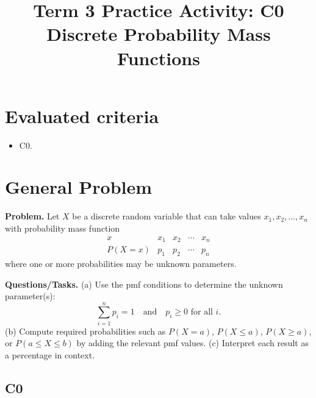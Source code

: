 \makeatletter
{}
\makeatother	



\title{Term 3 Practice Activity: C0 Discrete Probability Mass Functions}
\author{}
\date{}


	\maketitle

	\setcounter{tocdepth}{1}
	\setcounter{secnumdepth}{2}
	\tableofcontents

	\section*{Evaluated criteria}
	\begin{itemize}
		\item C0.
	\end{itemize}

	
	\newcommand{\PMFHighlight}[2]{%
		\addplot+[ycomb, mark=*, line width=0.8pt, blue] coordinates {#1};
		\addplot+[ycomb, mark=*, line width=1.3pt, black] coordinates {#2};
	}
	
	

\section{General Problem}
		
		\textbf{Problem.}
		Let $X$ be a discrete random variable that can take values $x_1,x_2,\dots,x_n$ with probability mass function
		\[
		\begin{array}{c|cccc}
			x & x_1 & x_2 & \cdots & x_n\\
			\hline
			P(X=x) & p_1 & p_2 & \cdots & p_n
		\end{array}
		\]
		where one or more probabilities may be unknown parameters.
		
		\textbf{Questions/Tasks.}
		(a) Use the pmf conditions to determine the unknown parameter(s):
		\[
		\sum_{i=1}^{n}p_i=1\quad\text{and}\quad p_i\ge 0\text{ for all }i.
		\]
		(b) Compute required probabilities such as $P(X=a)$, $P(X\le a)$, $P(X\ge a)$, or $P(a\le X\le b)$ by adding the relevant pmf values.
		(c) Interpret each result as a percentage in context.
		
		\subsection*{C0}
		
